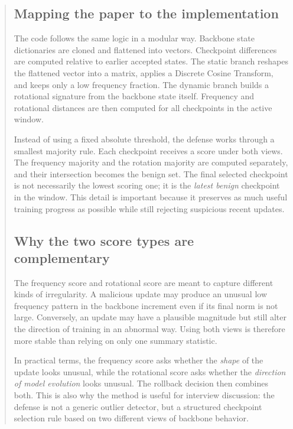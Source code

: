 \documentclass{article}
\begin{document}
\begin{abstract}
\subsection{Mapping the paper to the implementation}

The code follows the same logic in a modular way. Backbone state dictionaries are cloned and flattened into vectors. Checkpoint differences are computed relative to earlier accepted states. The static branch reshapes the flattened vector into a matrix, applies a Discrete Cosine Transform, and keeps only a low frequency fraction. The dynamic branch builds a rotational signature from the backbone state itself. Frequency and rotational distances are then computed for all checkpoints in the active window.

Instead of using a fixed absolute threshold, the defense works through a smallest majority rule. Each checkpoint receives a score under both views. The frequency majority and the rotation majority are computed separately, and their intersection becomes the benign set. The final selected checkpoint is not necessarily the lowest scoring one; it is the \emph{latest benign} checkpoint in the window. This detail is important because it preserves as much useful training progress as possible while still rejecting suspicious recent updates.

\subsection{Why the two score types are complementary}

The frequency score and rotational score are meant to capture different kinds of irregularity. A malicious update may produce an unusual low frequency pattern in the backbone increment even if its final norm is not large. Conversely, an update may have a plausible magnitude but still alter the direction of training in an abnormal way. Using both views is therefore more stable than relying on only one summary statistic.

In practical terms, the frequency score asks whether the \emph{shape} of the update looks unusual, while the rotational score asks whether the \emph{direction of model evolution} looks unusual. The rollback decision then combines both. This is also why the method is useful for interview discussion: the defense is not a generic outlier detector, but a structured checkpoint selection rule based on two different views of backbone behavior.

\begin{figure}[t]
  \centering
\end{figure}
\end{abstract}
\end{document}
